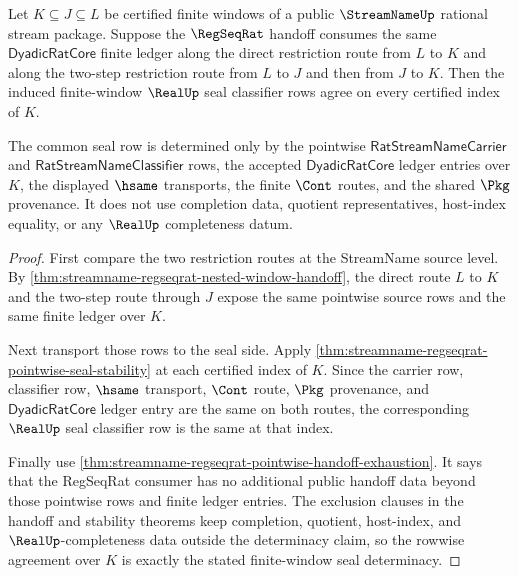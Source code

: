 \begin{theorem}
\label{thm:streamname-regseqrat-nested-window-seal-determinacy}
Let $K \subseteq J \subseteq L$ be certified finite windows of a public
$\StreamNameUp$ rational stream package. Suppose the $\RegSeqRat$ handoff
consumes the same $\mathsf{DyadicRatCore}$ finite ledger along the direct
restriction route from $L$ to $K$ and along the two-step restriction route from
$L$ to $J$ and then from $J$ to $K$. Then the induced finite-window $\RealUp$
seal classifier rows agree on every certified index of $K$.

The common seal row is determined only by the pointwise
$\mathsf{RatStreamNameCarrier}$ and
$\mathsf{RatStreamNameClassifier}$ rows, the accepted
$\mathsf{DyadicRatCore}$ ledger entries over $K$, the displayed $\hsame$
transports, the finite $\Cont$ routes, and the shared $\Pkg$ provenance. It
does not use completion data, quotient representatives, host-index equality,
or any $\RealUp$ completeness datum.
\end{theorem}
\begin{proof}
First compare the two restriction routes at the StreamName source level. By
\autoref{thm:streamname-regseqrat-nested-window-handoff}, the direct route
$L$ to $K$ and the two-step route through $J$ expose the same pointwise source
rows and the same finite ledger over $K$.

Next transport those rows to the seal side. Apply
\autoref{thm:streamname-regseqrat-pointwise-seal-stability} at each certified
index of $K$. Since the carrier row, classifier row, $\hsame$ transport,
$\Cont$ route, $\Pkg$ provenance, and $\mathsf{DyadicRatCore}$ ledger entry are
the same on both routes, the corresponding $\RealUp$ seal classifier row is the
same at that index.

Finally use
\autoref{thm:streamname-regseqrat-pointwise-handoff-exhaustion}. It says that
the RegSeqRat consumer has no additional public handoff data beyond those
pointwise rows and finite ledger entries. The exclusion clauses in the handoff
and stability theorems keep completion, quotient, host-index, and
$\RealUp$-completeness data outside the determinacy claim, so the rowwise
agreement over $K$ is exactly the stated finite-window seal determinacy.
\end{proof}

